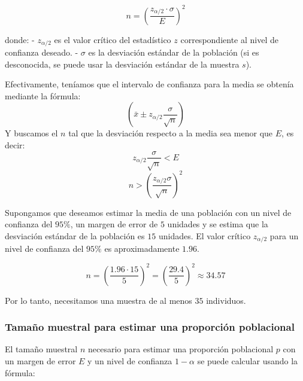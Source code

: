 \documentclass[
  letterpaper,
  DIV=11,
  numbers=noendperiod]{scrreprt}
\begin{document}
\[
n = \left( \frac{z_{\alpha/2} \cdot \sigma}{E} \right)^2
\]

donde: - \(z_{\alpha/2}\) es el valor crítico del estadístico \(z\)
correspondiente al nivel de confianza deseado. - \(\sigma\) es la
desviación estándar de la población (si es desconocida, se puede usar la
desviación estándar de la muestra \(s\)).

Efectivamente, teníamos que el intervalo de confianza para la media se
obtenía mediante la fórmula: \[
\left ( \bar{x} \pm z_{\alpha/2}\frac{\sigma}{\sqrt{n}} \right )
\] Y buscamos el \(n\) tal que la desviación respecto a la media sea
menor que \(E\), es decir: \[
 z_{\alpha/2}\frac{\sigma}{\sqrt{n}}  < E
\] \[
n >  \left ( \frac{z_{\alpha/2} \sigma}{\sqrt{n}} \right )^2
\]

\begin{tcolorbox}[enhanced jigsaw, arc=.35mm, breakable, coltitle=black, left=2mm, opacityback=0, bottomtitle=1mm, colbacktitle=quarto-callout-tip-color!10!white, title=\textcolor{quarto-callout-tip-color}{\faLightbulb}\hspace{0.5em}{Ejemplo. Tamaño muestral para la estimación de una Media}, titlerule=0mm, colback=white, colframe=quarto-callout-tip-color-frame, bottomrule=.15mm, rightrule=.15mm, opacitybacktitle=0.6, toptitle=1mm, toprule=.15mm, leftrule=.75mm]

Supongamos que deseamos estimar la media de una población con un nivel
de confianza del \(95\%\), un margen de error de \(5\) unidades y se
estima que la desviación estándar de la población es \(15\) unidades. El
valor crítico \(z_{\alpha/2}\) para un nivel de confianza del \(95\%\)
es aproximadamente \(1.96\).

\[
n = \left( \frac{1.96 \cdot 15}{5} \right)^2 = \left( \frac{29.4}{5} \right)^2 \approx 34.57
\]

Por lo tanto, necesitamos una muestra de al menos \(35\) individuos.

\end{tcolorbox}

\hypertarget{tamauxf1o-muestral-para-estimar-una-proporciuxf3n-poblacional}{%
\subsubsection{Tamaño muestral para estimar una proporción
poblacional}\label{tamauxf1o-muestral-para-estimar-una-proporciuxf3n-poblacional}}

El tamaño muestral \(n\) necesario para estimar una proporción
poblacional \(p\) con un margen de error \(E\) y un nivel de confianza
\(1 - \alpha\) se puede calcular usando la fórmula:
\end{document}
